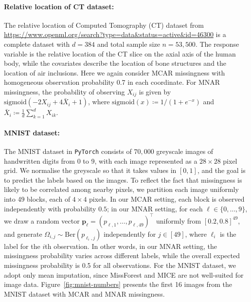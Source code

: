 \documentclass[12pt]{article}
\begin{document}
\paragraph{Relative location of CT dataset:} The relative location of Computed Tomography (CT) dataset from \url{https://www.openml.org/search?type=data&status=active&id=46300} is a complete dataset with $d=384$ and total sample size $n=53{,}500$.  The response variable is the relative location of the CT slice on the axial axis of the human body, while the covariates describe the location of bone structures and the location of air inclusions.  Here we again consider MCAR missingness with homogeneous observation probability 0.7 in each coordinate.  For MNAR missingness, the probability of observing $X_{ij}$ is given by $\mathrm{sigmoid}(-2X_{ij} + 4\bar{X}_i + 1)$, where $\mathrm{sigmoid}(x) \coloneqq 1/(1+e^{-x})$ and $\bar{X}_i \coloneqq \frac{1}{d} \sum_{k=1}^d X_{ik}$.  



\paragraph{MNIST dataset:} The MNIST dataset \citep{lecun1998mnist} in \texttt{PyTorch} consists of $70{,}000$ greyscale images of handwritten digits from 0 to 9, with each image represented as a $28 \times 28$ pixel grid. We normalise the greyscale so that it takes values in $[0,1]$, and the goal is to predict the labels based on the images.  To reflect the fact that missingness is likely to be correlated among nearby pixels, we partition each image uniformly into 49 blocks, each of $4\times 4$ pixels.  In our MCAR setting, each block is observed independently with probability $0.5$; in our MNAR setting, for each $\ell\in\{0,\ldots,9\}$, we draw a random vector $\bm p_\ell = (p_{\ell,1},\ldots,p_{\ell,49})^\top$ uniformly from $[0.2,0.8]^{49}$, and generate $\Omega_{i,j} \sim \mathrm{Ber}(p_{\ell_i,j})$ independently for $j \in [49]$, where $\ell_i$ is the label for the $i$th observation. In other words, in our MNAR setting, the missingness probability varies across different labels, while the overall expected missingness probability is 0.5 for all observations.  For the MNIST dataset, we adopt only mean imputation, since MissForest and MICE are not well-suited for image data.  Figure~\ref{fig:mnist-numbers} presents the first 16 images from the MNIST dataset with MCAR and MNAR missingness.
\end{document}
